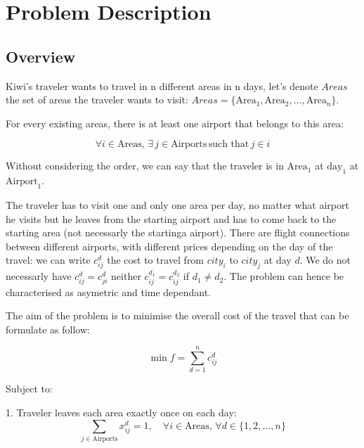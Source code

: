 \chapter{Problem Description}
\label{Chapter3}

\section{Overview}

Kiwi's traveler wants to travel in n different areas in n days, let's denote $Areas$ the set of areas the traveler wants to visit: $Areas = \{ \text{Area}_1, \text{Area}_2, \ldots, \text{Area}_n \}$.

For every existing areas, there is at least one airport that belongs to this area:

\begin{equation}
    \forall i \in \text{Areas}, \, \exists \, j \in \text{Airports} \, \text{such that} \, j \in i
\end{equation}

Without considering the order, we can say that the traveler is in \( \text{Area}_1 \) at \( \text{day}_1 \) at \( \text{Airport}_1 \).

The traveler has to visit one and only one area per day, no matter what airport he visits but he leaves from the starting airport and has to come back to the starting area (not necessarly the startinga airport).
There are flight connections between different airports, with different prices depending on the day of the travel:
we can write $c^{d}_{ij}$ the cost to travel from $city_i$ to $city_j$ at day $d$. We do not necessarly have $c^{d}_{ij}=c^{d}_{ji}$ neither $c^{d_1}_{ij}=c^{d_2}_{ij}$ if $d_1 \neq d_2$. The problem can hence be characterised as asymetric and time dependant.

The aim of the problem is to minimise the overall cost of the travel that can be formulate as follow:

\begin{equation}
    \min f = \sum_{d=1}^{n} c^d_{ij}
\end{equation}   

Subject to:

1. Traveler leaves each area exactly once on each day:
\begin{equation}
    \sum_{j \in \text{Airports}} x^d_{ij} = 1, \quad \forall i \in \text{Areas}, \, \forall d \in \{1, 2, \ldots, n\}
\end{equation}


